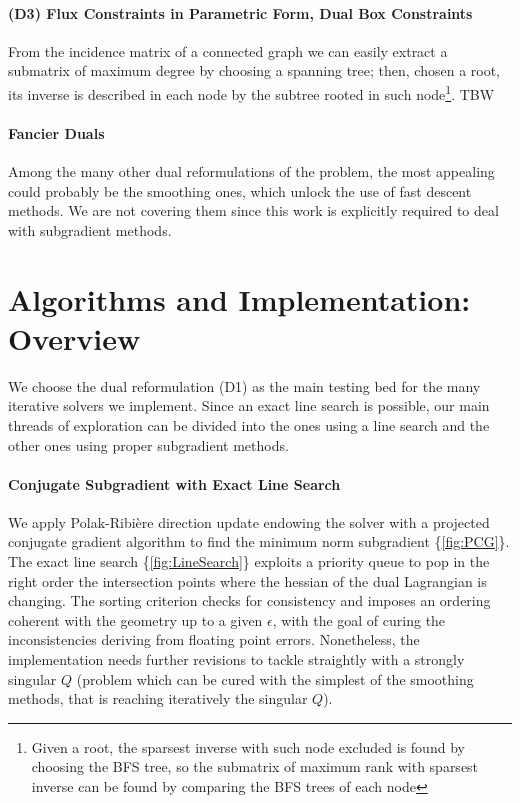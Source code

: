 \documentclass[10pt,twoside,book,a5paper]{ncc}
\begin{document}
\paragraph{(D3) Flux Constraints in Parametric Form, Dual Box Constraints}
From the incidence matrix of a connected graph we can easily extract a submatrix of maximum degree by choosing a spanning tree; then, chosen a root, its inverse is described in each node by the subtree rooted in such node\footnote{Given a root, the sparsest inverse with such node excluded is found by choosing the BFS tree, so the submatrix of maximum rank with sparsest inverse can be found by comparing the BFS trees of each node}.
TBW
\paragraph{Fancier Duals}
Among the many other dual reformulations of the problem, the most appealing could probably be the smoothing ones, which unlock the use of fast descent methods\cite{Universal}. We are not covering them since this work is explicitly required to deal with subgradient methods.

\section{Algorithms and Implementation: Overview}
We choose the dual reformulation (D1) as the main testing bed for the many iterative solvers we implement. Since an exact line search is possible, our main threads of exploration can be divided into the ones using a line search and the other ones using proper subgradient methods.
\paragraph{Conjugate Subgradient with Exact Line Search} We apply Polak-Ribière direction update endowing the solver with a projected conjugate gradient algorithm to find the minimum norm subgradient \{\ref{fig:PCG}\}. The exact line search \{\ref{fig:LineSearch}\} exploits a priority queue to pop in the right order the intersection points where the hessian of the dual Lagrangian is changing. The sorting criterion checks for consistency and imposes an ordering coherent with the geometry up to a given $\epsilon$, with the goal of curing the inconsistencies deriving from floating point errors. Nonetheless, the implementation needs further revisions to tackle straightly with a strongly singular $Q$ (problem which can be cured with the simplest of the smoothing methods, that is reaching iteratively the singular $Q$).
\end{document}
